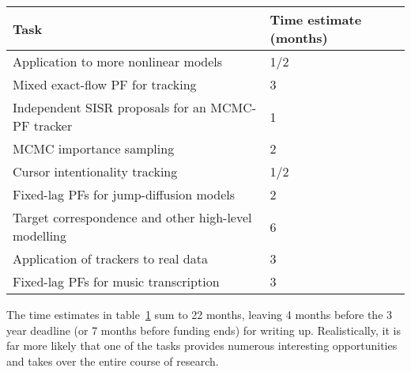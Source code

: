 \begin{table} \centering
\begin{tabular}{|l|l|}
\hline
Task & Time estimate (months) \\
\hline \hline
Application to more nonlinear models & 1/2 \\
Mixed exact-flow PF for tracking & 3 \\
Independent SISR proposals for an MCMC-PF tracker & 1 \\
MCMC importance sampling & 2 \\
Cursor intentionality tracking & 1/2 \\
Fixed-lag PFs for jump-diffusion models & 2 \\
Target correspondence and other high-level modelling & 6 \\
Application of trackers to real data & 3 \\
Fixed-lag PFs for music transcription & 3 \\
\hline
\end{tabular}
\caption{}
\label{tab:FuturePlan}
\end{table}

The time estimates in table~\ref{tab:FuturePlan} sum to 22 months, leaving 4 months before the 3 year deadline (or 7 months before funding ends) for writing up. Realistically, it is far more likely that one of the tasks provides numerous interesting opportunities and takes over the entire course of research.
